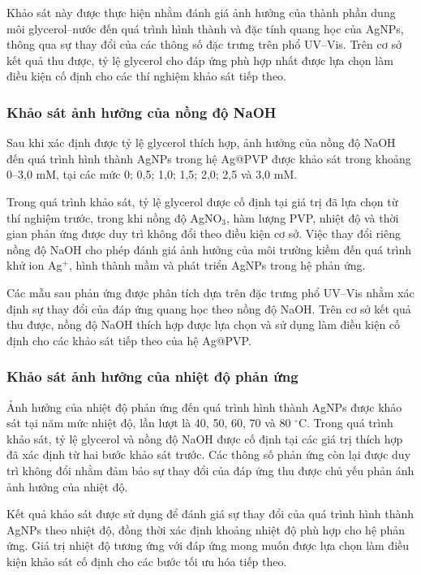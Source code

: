 Khảo sát này được thực hiện nhằm đánh giá ảnh hưởng của thành phần dung môi glycerol–nước đến quá trình hình thành và đặc tính quang học của AgNPs, thông qua sự thay đổi của các thông số đặc trưng trên phổ UV–Vis. 
Trên cơ sở kết quả thu được, tỷ lệ glycerol cho đáp ứng phù hợp nhất được lựa chọn làm điều kiện cố định cho các thí nghiệm khảo sát tiếp theo.

\subsubsection{Khảo sát ảnh hưởng của nồng độ NaOH}
Sau khi xác định được tỷ lệ glycerol thích hợp, ảnh hưởng của nồng độ NaOH đến quá trình hình thành AgNPs trong hệ Ag@PVP được khảo sát trong khoảng 0–3,0 mM, tại các mức 0; 0,5; 1,0; 1,5; 2,0; 2,5 và 3,0 mM.

Trong quá trình khảo sát, tỷ lệ glycerol được cố định tại giá trị đã lựa chọn từ thí nghiệm trước, trong khi nồng độ AgNO$_3$, hàm lượng PVP, nhiệt độ và thời gian phản ứng được duy trì không đổi theo điều kiện cơ sở. 
Việc thay đổi riêng nồng độ NaOH cho phép đánh giá ảnh hưởng của môi trường kiềm đến quá trình khử ion Ag$^+$, hình thành mầm và phát triển AgNPs trong hệ phản ứng.

Các mẫu sau phản ứng được phân tích dựa trên đặc trưng phổ UV–Vis nhằm xác định sự thay đổi của đáp ứng quang học theo nồng độ NaOH. 
Trên cơ sở kết quả thu được, nồng độ NaOH thích hợp được lựa chọn và sử dụng làm điều kiện cố định cho các khảo sát tiếp theo của hệ Ag@PVP.

\subsubsection{Khảo sát ảnh hưởng của nhiệt độ phản ứng}
Ảnh hưởng của nhiệt độ phản ứng đến quá trình hình thành AgNPs được khảo sát tại năm mức nhiệt độ, lần lượt là 40, 50, 60, 70 và 80 $^\circ$C. 
Trong quá trình khảo sát, tỷ lệ glycerol và nồng độ NaOH được cố định tại các giá trị thích hợp đã xác định từ hai bước khảo sát trước. 
Các thông số phản ứng còn lại được duy trì không đổi nhằm đảm bảo sự thay đổi của đáp ứng thu được chủ yếu phản ánh ảnh hưởng của nhiệt độ.

Kết quả khảo sát được sử dụng để đánh giá sự thay đổi của quá trình hình thành AgNPs theo nhiệt độ, đồng thời xác định khoảng nhiệt độ phù hợp cho hệ phản ứng. 
Giá trị nhiệt độ tương ứng với đáp ứng mong muốn được lựa chọn làm điều kiện khảo sát cố định cho các bước tối ưu hóa tiếp theo.


